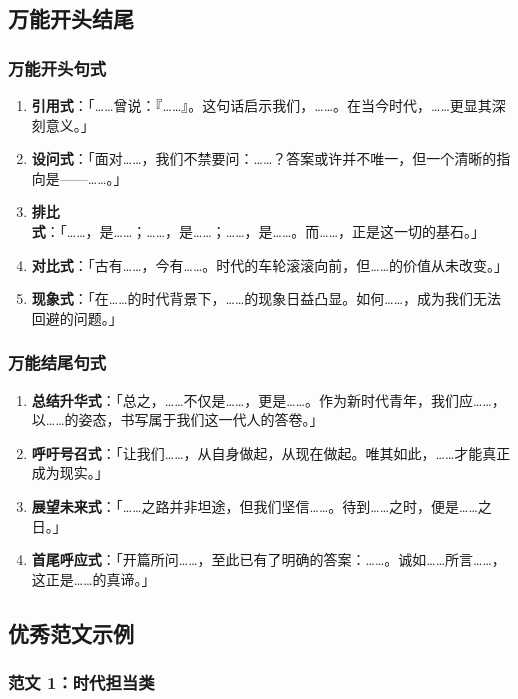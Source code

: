 \subsection{万能开头结尾}

\subsubsection{万能开头句式}

\begin{enumerate}
  \item \textbf{引用式}：「……曾说：『……』。这句话启示我们，……。在当今时代，……更显其深刻意义。」
  \item \textbf{设问式}：「面对……，我们不禁要问：……？答案或许并不唯一，但一个清晰的指向是——……。」
  \item \textbf{排比式}：「……，是……；……，是……；……，是……。而……，正是这一切的基石。」
  \item \textbf{对比式}：「古有……，今有……。时代的车轮滚滚向前，但……的价值从未改变。」
  \item \textbf{现象式}：「在……的时代背景下，……的现象日益凸显。如何……，成为我们无法回避的问题。」
\end{enumerate}

\subsubsection{万能结尾句式}

\begin{enumerate}
  \item \textbf{总结升华式}：「总之，……不仅是……，更是……。作为新时代青年，我们应……，以……的姿态，书写属于我们这一代人的答卷。」
  \item \textbf{呼吁号召式}：「让我们……，从自身做起，从现在做起。唯其如此，……才能真正成为现实。」
  \item \textbf{展望未来式}：「……之路并非坦途，但我们坚信……。待到……之时，便是……之日。」
  \item \textbf{首尾呼应式}：「开篇所问……，至此已有了明确的答案：……。诚如……所言……，这正是……的真谛。」
\end{enumerate}

\subsection{优秀范文示例}

\subsubsection{范文 1：时代担当类}

